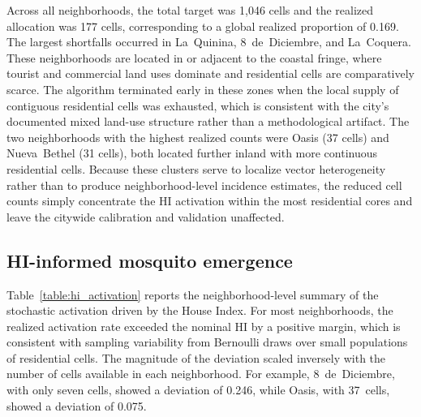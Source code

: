 \documentclass[applsci,article,accept,pdftex,moreauthors]{Definitions/mdpi}
\begin{document}
Across all neighborhoods, the total target was 1{,}046 cells and the realized allocation was 177 cells, corresponding to a global realized proportion of 0.169. The largest shortfalls occurred in La~Quinina, 8~de~Diciembre, and La~Coquera. These neighborhoods are located in or adjacent to the coastal fringe, where tourist and commercial land uses dominate and residential cells are comparatively scarce. The algorithm terminated early in these zones when the local supply of contiguous residential cells was exhausted, which is consistent with the city's documented mixed land-use structure rather than a methodological artifact. The two neighborhoods with the highest realized counts were Oasis (37 cells) and Nueva~Bethel (31 cells), both located further inland with more continuous residential cells. Because these clusters serve to localize vector heterogeneity rather than to produce neighborhood-level incidence estimates, the reduced cell counts simply concentrate the HI activation within the most residential cores and leave the citywide calibration and validation unaffected.

\subsection{HI-informed mosquito emergence}
\label{sec:results_hi}

Table~\ref{table:hi_activation} reports the neighborhood-level summary of the stochastic activation driven by the House Index. For most neighborhoods, the realized activation rate exceeded the nominal HI by a positive margin, which is consistent with sampling variability from Bernoulli draws over small populations of residential cells. The magnitude of the deviation scaled inversely with the number of cells available in each neighborhood. For example, 8~de~Diciembre, with only seven cells, showed a deviation of 0.246, while Oasis, with 37~cells, showed a deviation of 0.075.
\end{document}

